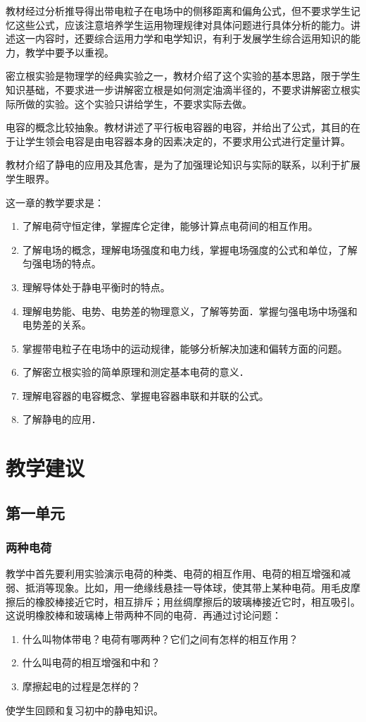 教材经过分析推导得出带电粒子在电场中的侧移距离和偏角公式，但不要求学生记忆这些公式，应该注意培养学生运用物理规律对具体问题进行具体分析的能力。讲述这一内容时，还要综合运用力学和电学知识，有利于发展学生综合运用知识的能力，教学中要予以重视。

密立根实验是物理学的经典实验之一，教材介绍了这个实验的基本思路，限于学生知识基础，不要求进一步讲解密立根是如何测定油滴半径的，不要求讲解密立根实际所做的实验。这个实验只讲给学生，不要求实际去做。

电容的概念比较抽象。教材讲述了平行板电容器的电容，并给出了公式，其目的在于让学生领会电容是由电容器本身的因素决定的，不要求用公式进行定量计算。

教材介绍了静电的应用及其危害，是为了加强理论知识与实际的联系，以利于扩展学生眼界。

这一章的教学要求是：
\begin{enumerate}
\item 了解电荷守恒定律，掌握库仑定律，能够计算点电荷间的相互作用。
\item 了解电场的概念，理解电场强度和电力线，掌握电场强度的公式和单位，了解匀强电场的特点。
\item 理解导体处于静电平衡时的特点。
\item 理解电势能、电势、电势差的物理意义，了解等势面．掌握匀强电场中场强和电势差的关系。
\item 掌握带电粒子在电场中的运动规律，能够分析解决加速和偏转方面的问题。
\item 了解密立根实验的简单原理和测定基本电荷的意义．
\item 理解电容器的电容概念、掌握电容器串联和并联的公式。
\item 了解静电的应用．
\end{enumerate}

\section{教学建议}
\subsection{第一单元}
\subsubsection{两种电荷}

教学中首先要利用实验演示电荷的种类、电荷的相互作用、电荷的相互增强和减弱、抵消等现象。比如，用一绝缘线悬挂一导体球，使其带上某种电荷。用毛皮摩擦后的橡胶棒接近它时，相互排斥；用丝绸摩擦后的玻璃棒接近它时，相互吸引。这说明橡胶棒和玻璃棒上带两种不同的电荷．再通过讨论问题：
\begin{enumerate}
    \item 什么叫物体带电？电荷有哪两种？它们之间有怎样的相互作用？
    \item 什么叫电荷的相互增强和中和？
    \item 摩擦起电的过程是怎样的？
\end{enumerate}
使学生回顾和复习初中的静电知识。

